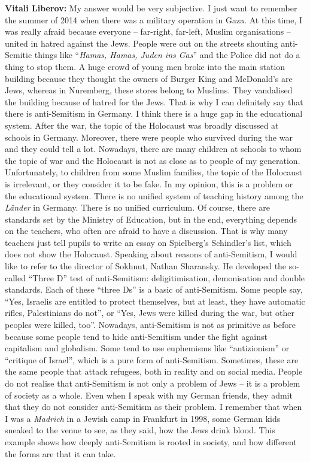 \textbf{Vitali Liberov:} My answer would be very subjective. I just want to remember the summer of 2014 when there was a military operation in Gaza. At this time, I was really afraid because everyone – far-right, far-left, Muslim organisations – united in hatred against the Jews. People were out on the streets shouting anti-Semitic things like ``\textit{Hamas, Hamas, Juden ins Gas}'' and the Police did not do a thing to stop them. A huge crowd of young men broke into the main station building because they thought the owners of Burger King and McDonald’s are Jews, whereas in Nuremberg, these stores belong to Muslims. They vandalised the building because of hatred for the Jews. That is why I can definitely say that there is anti-Semitism in Germany. I think there is a huge gap in the educational system. After the war, the topic of the Holocaust was broadly discussed at schools in Germany. Moreover, there were people who survived during the war and they could tell a lot. Nowadays, there are many children at schools to whom the topic of war and the Holocaust is not as close as to people of my generation. Unfortunately, to children from some Muslim families, the topic of the Holocaust is irrelevant, or they consider it to be fake. In my opinion, this is a problem or the educational system. There is no unified system of teaching history among the \textit{Länder} in Germany. There is no unified curriculum. Of course, there are standards set by the Ministry of Education, but in the end, everything depends on the teachers, who often are afraid to have a discussion. That is why many teachers just tell pupils to write an essay on Spielberg’s Schindler’s list, which does not show the Holocaust. Speaking about reasons of anti-Semitism, I would like to refer to the director of Sokhnut, Nathan Sharansky. He developed the so-called ``Three D'' test of anti-Semitism: deligitimisation, demonisation and double standards. Each of these ``three Ds'' is a basic of anti-Semitism. Some people say, ``Yes, Israelis are entitled to protect themselves, but at least, they have automatic rifles, Palestinians do not'', or ``Yes, Jews were killed during the war, but other peoples were killed, too''. Nowadays, anti-Semitism is not as primitive as before because some people tend to hide anti-Semitism under the fight against capitalism and globalism. Some tend to use euphemisms like ``antizionism'' or ``critique of Israel'', which is a pure form of anti-Semitism. Sometimes, these are the same people that attack refugees, both in reality and on social media. People do not realise that anti-Semitism is not only a problem of Jews – it is a problem of society as a whole. Even when I speak with my German friends, they admit that they do not consider anti-Semitism as their problem. I remember that when I was a \textit{Madrich} in a Jewish camp in Frankfurt in 1998, some German kids sneaked to the venue to see, as they said, how the Jews drink blood. This example shows how deeply anti-Semitism is rooted in society, and how different the forms are that it can take.  

